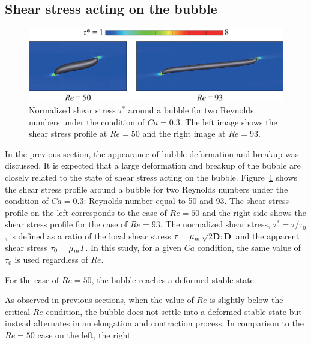 \documentclass[review]{elsarticle}
\newcommand{\vv}{\mathbf}
\newcommand{\bmD}{\vv{D}}
\begin{document}

\subsection{Shear stress acting on the bubble}
%
\begin{figure}%
  \centering
  \includegraphics[width=\textwidth]{8-ShearStress}
  \caption{Normalized shear stress $\tau^{\ast}$ around a bubble for 
	two Reynolds 
        numbers under the condition of $Ca = 0.3$. The left image shows the 
        shear stress profile at $Re=50$ and the right image at $Re=93$.
   }
  \label{fig:ShearStress}
\end{figure}
%
In the previous section, the appearance of bubble deformation and breakup was
discussed. It is expected that a large deformation and breakup of the bubble
are closely related to the state of shear stress acting on the bubble.
Figure~\ref{fig:ShearStress} shows the shear stress profile around a bubble for
two Reynolds numbers under the condition of $Ca = 0.3$: Reynolds number equal
to 50 and 93.  The shear stress profile on the left corresponds to the case of
$Re = 50$ and the right side shows the shear stress profile for the case of $Re
= 93$.  The normalized shear stress, $\tau^{\ast} = \tau / \tau_{0}$, is
defined as a ratio of the local shear stress $\tau = \mu_{\rm
m}$$\sqrt{2\bmD:\bmD}$ and the apparent shear stress $\tau_{0} = \mu_{\rm
m}$$\mathit{\Gamma}$.  In this study, for a given $Ca$ condition, the same
value of $\tau_{0}$ is used regardless of $Re$. 
\par\noindent
For the case of $Re = 50$, the bubble reaches a deformed stable state.  
\par\noindent
As observed in
previous sections, when the value of $Re$ is slightly below the 
critical $Re$ condition, the bubble does not settle into a deformed 
stable state but instead alternates in an elongation and contraction process.  
In comparison to the $Re=50$ case on the left, the right
\end{document}
